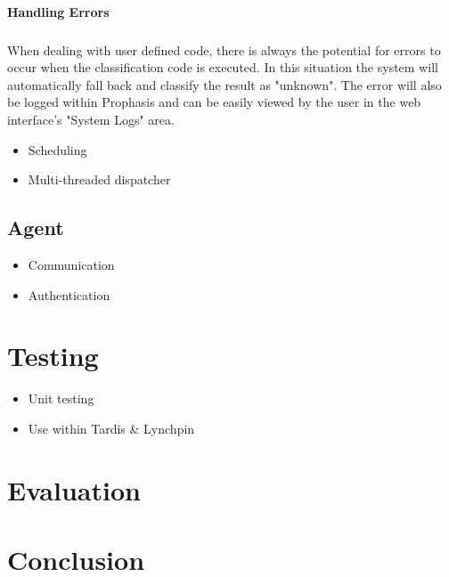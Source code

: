 \documentclass[bsc,logo,twoside]{infthesis}
\begin{document}
\subsubsection{Handling Errors}
\paragraph*{}
	When dealing with user defined code, there is always the potential for errors
	to occur when the classification code is executed.  In this situation the
	system will automatically fall back and classify the result as "unknown". The
	error will also be logged within Prophasis and can be easily viewed by the
	user in the web interface's "System Logs" area.
			
\begin{itemize}
	\item Scheduling
	\item Multi-threaded dispatcher
\end{itemize}

\section{Agent}
\begin{itemize}
	\item Communication
	\item Authentication
\end{itemize}

\chapter{Testing}
\begin{itemize}
	\item Unit testing
	\item Use within Tardis \& Lynchpin
\end{itemize}
	
\chapter{Evaluation}

\chapter{Conclusion}
\end{document}
